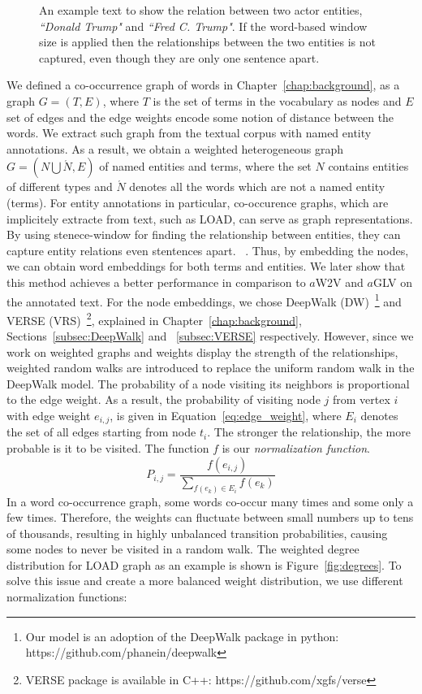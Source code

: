 \begin{figure}
\centering 
\resizebox{0.90\textwidth}{0.2\textwidth}{      

}
\caption{An example text to show the relation between two actor entities, \emph{``Donald Trump"} and \emph{``Fred C. Trump"}. If the word-based window size is applied then the relationships between the two entities is not captured, even though they are only one sentence apart. }
\label{fig:article_entities}
\end{figure}
\noindent
We defined a co-occurrence graph of words in Chapter~\ref{chap:background}, as a graph $G=(T,E)$, where $T$ is the set of terms in the vocabulary as nodes and $E$ set of edges and the edge weights encode some notion of distance between the words. We extract such graph from the textual corpus with named entity annotations. As a result, we obtain a weighted heterogeneous graph $G=(N\bigcup  \acute {N},E)$ of named entities and terms, where the set $N$ contains entities of different types and $ \acute {N }$ denotes all the words which are not a named entity (terms). For entity annotations in particular, co-occurence graphs, which are implicitely extracte from text, such as LOAD, can serve as graph representations. By using stenece-window for finding the relationship between entities, they can capture entity relations even stentences apart. ~. Thus, by embedding the nodes, we can obtain word embeddings for both terms and entities.  We later show that this method achieves a better performance in comparison to $a$W2V and $a$GLV on the annotated text. For the node embeddings, we chose DeepWalk (DW)~\footnote{Our model is an adoption of the DeepWalk package in python: https://github.com/phanein/deepwalk} and VERSE (VRS)~\footnote{VERSE package is available in C++: https://github.com/xgfs/verse}, explained in Chapter~\ref{chap:background}, Sections~\ref{subsec:DeepWalk} and ~\ref{subsec:VERSE} respectively. However, since we work on weighted graphs and weights display the strength of the relationships, weighted random walks are introduced to replace the uniform random walk in the DeepWalk model. The probability of a node visiting its neighbors is proportional to the edge weight. As a result, the probability of visiting node $j$ from vertex $i$ with edge weight $e_{i,j}$,  is given in Equation~\ref{eq:edge_weight}, where $ E_{ i }$ denotes the set of all edges starting from node $t_{i}$. The stronger the relationship, the more probable is it to be visited. The function $f$ is our \emph{normalization function}. 
\begin{equation}
P_{i,j}=\frac{f(e_{i,j})}{\sum _{ f(e_ k )\in E_{ i } }^{  }{ f(e_k) } }
\label{eq:edge_weight}
\end{equation}
In a word co-occurrence
graph, some words co-occur many times and some only a few times. Therefore, the weights can fluctuate between small numbers up to tens of thousands, resulting in highly unbalanced transition probabilities, causing some nodes to never be visited in a random walk. The weighted degree distribution for LOAD graph as an example is shown is Figure~\ref{fig:degrees}. To solve this issue and create a more balanced weight distribution, we use different normalization functions:

